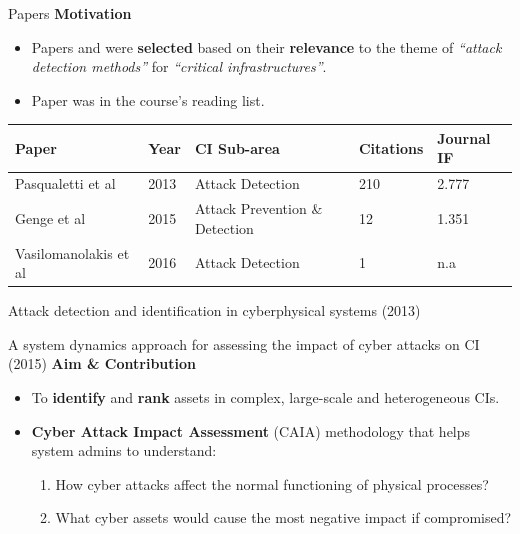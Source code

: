 \documentclass[compress]{beamer}
\begin{document}
\begin{frame}{Papers}
    \textbf{Motivation}
    \begin{itemize}
     \item Papers \cite{pasqualetti2013attack} and \cite{genge2015system} were \textbf{selected} based on their \textbf{relevance} to the theme of \textit{``attack detection methods''} for \textit{``critical infrastructures''}. 
     \item Paper \cite{vasilo2016multi} was in the course's reading list.

    \end{itemize}
    \begin{table}\tiny
	\begin{tabular}{|l|l|l|l|l|}
	\hline
	\textbf{Paper} & \textbf{Year} & \textbf{CI Sub-area} & \textbf{Citations} & \textbf{Journal IF}\\ 
	\hline \hline
	Pasqualetti et al \cite{pasqualetti2013attack} & 2013 & Attack Detection & 210 & 2.777\\
	Genge et al \cite{genge2015system} & 2015 & Attack Prevention \& Detection & 12 & 1.351\\
	Vasilomanolakis et al \cite{vasilo2016multi} & 2016 & Attack Detection & 1 & n.a \\
	\hline
	\end{tabular}
    \end{table}
\end{frame}
\begin{frame}{Attack detection and identification in cyberphysical systems
    (2013)}

\end{frame}
\begin{frame}{A system dynamics approach for assessing the impact of cyber attacks on CI (2015)}
    \textbf{Aim \& Contribution}
    \begin{itemize}
     \item To \textbf{identify} and \textbf{rank} assets in complex, large-scale and heterogeneous CIs.
     \item \textbf{Cyber Attack Impact Assessment} (CAIA) methodology that helps system admins to understand:
     \begin{enumerate}
      \item How cyber attacks affect the normal functioning of physical processes?
      \item What cyber assets would cause the most negative impact if compromised?
     \end{enumerate}
    \end{itemize}
\end{frame}
\end{document}
